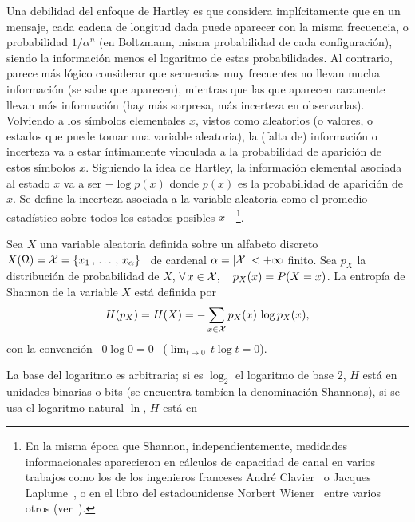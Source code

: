 Una debilidad del enfoque de Hartley es que considera impl\'icitamente que en un
mensaje, cada cadena de longitud dada  puede aparecer con la misma frecuencia, o
probabilidad   $1/\alpha^n$   (en   Boltzmann,   misma  probabilidad   de   cada
configuraci\'on),  siendo   la  informaci\'on   menos  el  logaritmo   de  estas
probabilidades.  Al  contrario, parece m\'as l\'ogico  considerar que secuencias
muy frecuentes  no llevan mucha  informaci\'on (se sabe que  aparecen), mientras
que las que  aparecen raramente llevan m\'as informaci\'on  (hay m\'as sorpresa,
m\'as incerteza  en observarlas).  Volviendo  a los s\'imbolos  elementales $x$,
vistos  como aleatorios  (o  valores, o  estados  que puede  tomar una  variable
aleatoria), la  (falta de)  informaci\'on o incerteza  va a  estar \'intimamente
vinculada a la probabilidad de aparici\'on de estos s\'imbolos $x$. Siguiendo la
idea de Hartley,  la informaci\'on elemental asociada al estado $x$  va a ser $-
\log p(x)$ donde $p(x)$ es la  probabilidad de aparici\'on de $x$.  Se define la
incerteza asociada a la variable  aleatoria como el promedio estad\'istico sobre
todos  los  estados posibles  $x$~\cite{Sha48,  ShaWea64}~\footnote{En la  misma
  \'epoca que Shannon, independientemente, medidades informacionales aparecieron
  en  c\'alculos de  capacidad  de canal  en  varios trabajos  como  los de  los
  ingenieros     franceses     Andr\'e     Clavier~\cite{Cla48}    o     Jacques
  Laplume~\cite{Lap48},   o    en   el   libro    del   estadounidense   Norbert
  Wiener~\cite[Cap.~III]{Wie48}  entre  varios  otros (ver~\cite[y  Ref.]{Ver98,
    Lun02, RioMag14, FlaRio16, RioFla17, Che17}).}.
%
\begin{definicion}
\label{Def:SZ:Shannon}
%
  Sea  $X$  una  variable  aleatoria  definida  sobre  un  alfabeto  discreto  \
  $X(\Omega) = \mathcal{X} = \{ x_1 \, , \, \ldots \,  , \, x_\alpha \}$ \ de cardenal $\alpha = |\mathcal{X}|
  < + \infty$ finito. Sea $p_X$  la distribuci\'on de probabilidad de $X$, \ie $
  \forall \, x \in \mathcal{X}, \quad p_X(x) = P(X = x)$.  La entrop\'ia de Shannon de la
  variable $X$ est\'a definida por
  \[
    H(p_X) = H(X) = - \sum_{x \in \mathcal{X}} p_X(x) \, \log p_X(x),
  \]
  con la  convenci\'on \ $0 \log  0 = 0$ \  ($\displaystyle \lim_{t \to  0} \, t
  \log t = 0$).
\end{definicion}
%
\noindent La  base del logaritmo es  arbitraria; si es $\log_2$  el logaritmo de
base  2, $H$  est\'a en  unidades  binarias o  bits (se  encuentra tamb\'ien  la
denominaci\'on Shannons),  si se usa el  logaritmo natural $\ln$,  $H$ est\'a en
